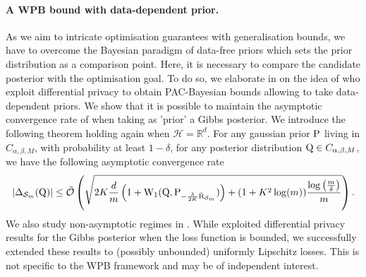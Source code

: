 \paragraph{A WPB bound with data-dependent prior.}
As we aim to intricate optimisation guarantees with generalisation bounds, we have to overcome the Bayesian paradigm of data-free priors which sets the prior distribution as a comparison point. Here, it is necessary to compare the candidate posterior with the optimisation goal. To do so, we elaborate in  on the idea of \citet{dziugaite2018data} who exploit differential privacy to obtain PAC-Bayesian bounds allowing to take data-dependent priors. We show that it is possible to maintain the asymptotic convergence rate of  when taking as 'prior' a Gibbs posterior.
We introduce the following theorem holding again when $\mathcal{H}=\mathbb{R}^d$. For any gaussian prior $\P$ living in $C_{\alpha,\beta,M}$, with probability at least $1-\delta$, for any posterior distribution $\Q\in C_{\alpha,\beta,M}$, we have the following asymptotic convergence rate
\begin{align*}
|\Delta_{\Sm}(\Q)|  \leq\Tilde{\mathcal{O}}\left( \sqrt{2K\frac{d}{m}\left(1 + \W_{1}(\Q,\P_{-\frac{\lambda}{2K}\Riskhat_{\Sm}})\right)+(1+K^2\log(m))\frac{\log\left( \frac{m}{\delta} \right)}{m}}   \right).
\end{align*}
We also study non-asymptotic regimes in . While \citet{dziugaite2018data} exploited differential privacy results for the Gibbs posterior when the loss function is bounded, we successfully extended these results to (possibly unbounded) uniformly Lipschitz losses. This is not specific to the WPB framework and may be of independent interest.

